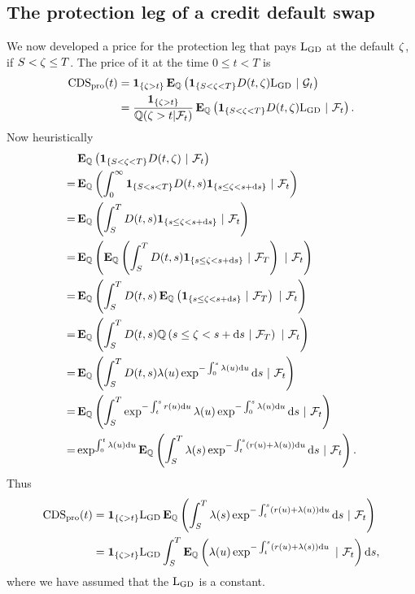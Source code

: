 \subsection{The protection leg of a credit default swap}

We now developed a price for the protection leg that pays $\mathrm{L_{GD}}$ at the default $\zeta$, if $S < \zeta \leq T$. The price of it at the time $0 \leq t < T$ is
  \begin{align}
    \operatorname{\mathrm{CDS_{pro}}}(t) &= \boldsymbol{1}_{ \{ \zeta > t \} } \operatorname{\boldsymbol{\mathrm{E}}}_{\mathbb{Q}} \left( \boldsymbol{1}_{ \{ S < \zeta < T \} } D(t,\zeta) \mathrm{L_{GD}} \ | \ \mathcal{G}_t \right) \\
    &= \frac{ \boldsymbol{1}_{ \{ \zeta > t \} } }{ \mathbb{Q} (\zeta > t | \mathcal{F}_t ) } \operatorname{\boldsymbol{\mathrm{E}}}_{\mathbb{Q}} \left( \boldsymbol{1}_{ \{ S < \zeta < T \} } D(t,\zeta) \mathrm{L_{GD}} \ | \ \mathcal{F}_t \right) .
  \end{align}
Now heuristically
  \begin{align}
    & \operatorname{\boldsymbol{\mathrm{E}}}_{\mathbb{Q}} \left( \boldsymbol{1}_{ \{ S < \zeta < T \} } D(t,\zeta) \ | \ \mathcal{F}_t \right) \\ 
    = & \operatorname{\boldsymbol{\mathrm{E}}}_{\mathbb{Q}} \left( \int_0^{\infty} \boldsymbol{1}_{ \{ S < s < T \} } D(t,s) \boldsymbol{1}_{ \{ s \leq \zeta < s + \mathrm{d} s \} } \ | \ \mathcal{F}_t \right) \\
    = & \operatorname{\boldsymbol{\mathrm{E}}}_{\mathbb{Q}} \left( \int_{S}^{T} D(t,s) \boldsymbol{1}_{ \{ s \leq \zeta < s + \mathrm{d} s \} } \ | \ \mathcal{F}_t \right) \\
    = & \operatorname{\boldsymbol{\mathrm{E}}}_{\mathbb{Q}} \left( \operatorname{\boldsymbol{\mathrm{E}}}_{\mathbb{Q}}  \left( \int_{S}^{T} D(t,s) \boldsymbol{1}_{ \{ s \leq \zeta < s + \mathrm{d} s \} } \ | \ \mathcal{F}_{T} \right) \ | \ \mathcal{F}_t \right) \\
    = & \operatorname{\boldsymbol{\mathrm{E}}}_{\mathbb{Q}} \left( \int_{S}^{T} D(t,s) \operatorname{\boldsymbol{\mathrm{E}}}_{\mathbb{Q}}  \left( \boldsymbol{1}_{ \{ s \leq \zeta < s + \mathrm{d} s \} } \ | \ \mathcal{F}_{T} \right) \ | \ \mathcal{F}_t \right) \\
    = & \operatorname{\boldsymbol{\mathrm{E}}}_{\mathbb{Q}} \left( \int_{S}^{T} D(t,s) \mathbb{Q} \left( s \leq \zeta < s + \mathrm{d} s \ | \ \mathcal{F}_{T} \right) \ | \ \mathcal{F}_t \right) \\
    = & \operatorname{\boldsymbol{\mathrm{E}}}_{\mathbb{Q}} \left( \int_{S}^{T} D(t,s) \lambda(u) \exp^{ - \int_0^s \lambda(u) \mathrm{d} u } \mathrm{d} s \ | \ \mathcal{F}_t \right) \\
    = & \operatorname{\boldsymbol{\mathrm{E}}}_{\mathbb{Q}} \left( \int_{S}^{T} \exp^{ - \int_t^s r(u) \mathrm{d} u }  \lambda(u) \exp^{ - \int_0^s \lambda(u) \mathrm{d} u } \mathrm{d} s \ | \ \mathcal{F}_t \right) \\
    = & \exp^{ \int_0^t \lambda(u) \mathrm{d} u } \operatorname{\boldsymbol{\mathrm{E}}}_{\mathbb{Q}} \left( \int_{S}^{T}  \lambda(s) \exp^{ - \int_t^s (r(u) + \lambda(u)) \mathrm{d} u } \mathrm{d} s \ | \ \mathcal{F}_t \right) .
  \end{align}
Thus
 \begin{align}
\Protection(t) &= \1_{ \{ \default > t \} } \LGD \E_{\Pm} \left( \int_{S}^{T}  \lambda(s) \exp^{ - \int_t^s (r(u) + \lambda(u)) \dx u } \dx s \ | \ \F_t \right) \\
	&= \1_{ \{ \default > t \} } \LGD \int_{S}^{T} \E_{\Pm} \left( \lambda(u) \exp^{ - \int_t^s (r(u) + \lambda(s)) \dx u }  \ | \ \F_t \right) \dx s,
\end{align}
where we have assumed that the $\mathrm{L_{GD}}$ is a constant.

